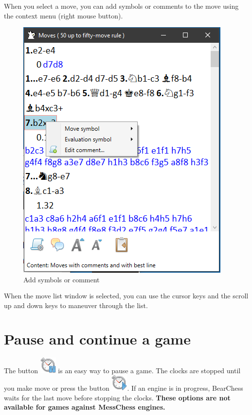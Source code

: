 \documentclass[11pt,a4paper]{article}
\begin{document}
When you select a move, you can add symbols or comments to the move using the context menu (right mouse button).

\begin{figure}[H]
	\centering
	\includegraphics[scale=1.0]{movelist2.png}
	\caption{Add symbols or comment}
	\label{fig:moveList2}
\end{figure}


When the move list window is selected, you can use the cursor keys and the scroll up and down keys to maneuver through the list.

\section{Pause and continue a game} \label{pauseAGame}

The button \includegraphics[scale=0.4]{stopwatch_pause.png} is an easy way to pause a game.  The clocks are stopped until you make move or press the button \includegraphics[scale=0.4]{stopwatch_start.png}. If an engine is in progress, BearChess waits for the last move before stopping the clocks. \textbf{These options are not available for games against MessChess engines.}
\end{document}
